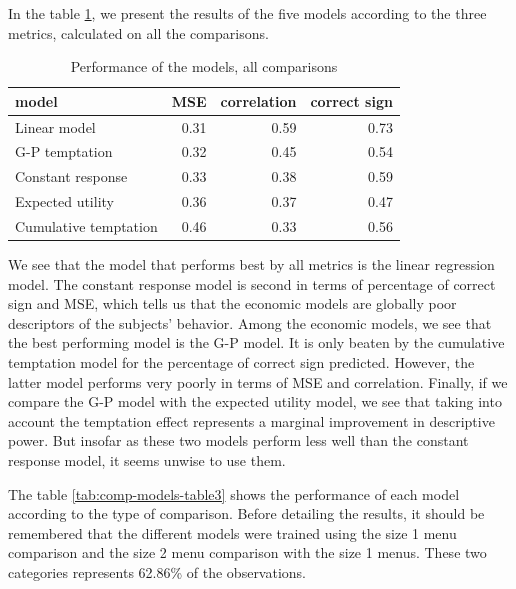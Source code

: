 \documentclass[
]{book}
\begin{document}
In the table \ref{tab:models-table3}, we present the results of the five models
according to the three metrics, calculated on all the comparisons.

\begin{table}

\caption{\label{tab:models-table3}Performance of the models, all comparisons}
\centering
\begin{tabular}[t]{l|r|r|r}
\hline
model & MSE & correlation & correct sign\\
\hline
Linear model & 0.31 & 0.59 & 0.73\\
\hline
G-P temptation & 0.32 & 0.45 & 0.54\\
\hline
Constant response & 0.33 & 0.38 & 0.59\\
\hline
Expected utility & 0.36 & 0.37 & 0.47\\
\hline
Cumulative temptation & 0.46 & 0.33 & 0.56\\
\hline
\end{tabular}
\end{table}

We see that the model that performs best by all metrics is the linear regression
model.
The constant response model is second in terms of percentage of correct sign and
MSE, which tells us that the economic models are globally poor descriptors of
the subjects' behavior.
Among the economic models, we see that the best performing model is the G-P
model.
It is only beaten by the cumulative temptation model for the percentage of
correct sign predicted.
However, the latter model performs very poorly in terms of MSE and correlation.
Finally, if we compare the G-P model with the expected utility model, we see
that taking into account the temptation effect represents a marginal improvement
in descriptive power.
But insofar as these two models perform less well than the constant response
model, it seems unwise to use them.

The table \ref{tab:comp-models-table3} shows the performance of each model according to the type of
comparison.
Before detailing the results, it should be remembered that the different models
were trained using the size 1 menu comparison and the size 2 menu comparison
with the size 1 menus.
These two categories represents 62.86\% of the observations.
\end{document}
